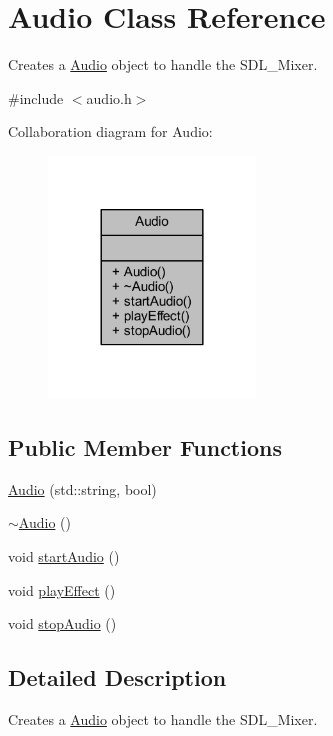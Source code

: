 \hypertarget{class_audio}{\section{Audio Class Reference}
\label{class_audio}
}


Creates a \hyperlink{class_audio}{Audio} object to handle the S\+D\+L\+\_\+\+Mixer.  




{\ttfamily \#include $<$audio.\+h$>$}



Collaboration diagram for Audio\+:
\nopagebreak
\begin{figure}[H]
\begin{center}
\leavevmode
\includegraphics[width=156pt]{class_audio__coll__graph}
\end{center}
\end{figure}
\subsection*{Public Member Functions}
\begin{DoxyCompactItemize}
\item 
\hyperlink{class_audio_ae1900ee0e5254fe0c96e0b423ea02777}{Audio} (std\+::string, bool)
\item 
\hyperlink{class_audio_ae8f54deecb5f48511aaab469e80294d6}{$\sim$\+Audio} ()
\item 
void \hyperlink{class_audio_a15f1ea89039f6dbbb2260bb34f9dabdd}{start\+Audio} ()
\item 
void \hyperlink{class_audio_aea41cc6feaed4b1ab5957ea499509f55}{play\+Effect} ()
\item 
void \hyperlink{class_audio_a5d73ae24c80b37df5f167016de9c9296}{stop\+Audio} ()
\end{DoxyCompactItemize}


\subsection{Detailed Description}
Creates a \hyperlink{class_audio}{Audio} object to handle the S\+D\+L\+\_\+\+Mixer. 

